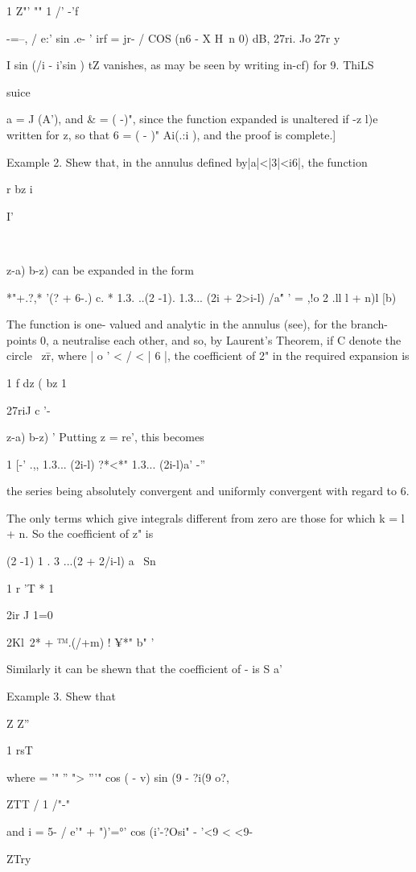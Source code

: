 {{1 Z"' "" 1 /' -'f

 -=--, / e:' sin .e- ' irf = jr- / COS (n6 - X H\ n 0) dB, 27ri. Jo
27r y

I sin (/i - i'sin ) tZ vanishes, as may be seen by writing in-cf) for
9. ThiLS

suice

a = J (A'), and \& = ( -)", since the function expanded is unaltered
if -z  l)e written for z, so that 6 = ( - )" Ai(.:i ), and the proof
is complete.]

Example 2. Shew that, in the annulus defined by|a|<|3|<i6|, the
function

r bz i

I'

\ \ {z-a) b-z) can be expanded in the form

*"+.?,* '(? + 6-.) c. * 1.3. ..(2 -1). 1.3... (2i + 2>i-l) /a\' " ' =
,!o 2 .ll l + n)l [b)

The function is one- valued and analytic in the annulus (see),
for the branch-points 0, a neutralise each other, and so, by Laurent's
Theorem, if C denote the circle \ z\=r, where | o ' < / < | 6 |, the
coefficient of 2" in the required expansion is

1 f dz ( bz 1

27riJ c '- \ \ {z-a) b-z) ' Putting z = re', this becomes

1 [-' .,, 1.3... (2i-l) ?*<*" 1.3... (2i-l)a' -''

the series being absolutely convergent and uniformly convergent with
regard to 6.

The only terms which give integrals different from zero are those for
which k = l + n. So the coefficient of z" is

(2 -1) 1 . 3 ...(2 + 2/i-l) a \ Sn

1 r 'T * 1

2ir J 1=0

2Kl\ 2* + ™.(/+m) ! ¥*" b" '

Similarly it can be shewn that the coefficient of - is S a'\

%
%

Example 3. Shew that

Z Z''

1 rsT

where = '" '' "> '''" cos ( - v) sin (9 - ?i(9 o?,

ZTT / 1 /"-"

and i = 5- / e'" + ")'=°' cos (i'-?Osi" - '<9 < <9-

ZTry

}}}}
